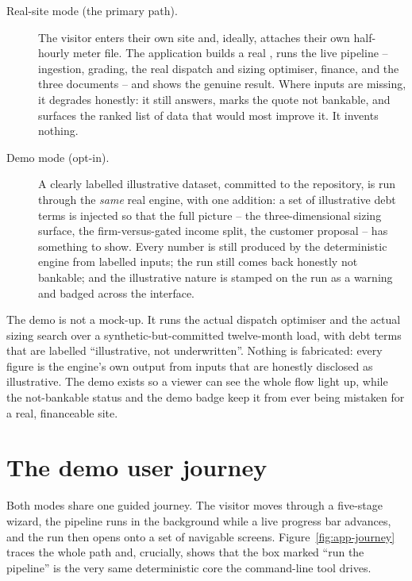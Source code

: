 \begin{description}
  \item[Real-site mode (the primary path).] The visitor enters their own site and, ideally, attaches their own half-hourly meter file. The application builds a real , runs the live pipeline -- ingestion, grading, the real dispatch and sizing optimiser, finance, and the three documents -- and shows the genuine result. Where inputs are missing, it degrades honestly: it still answers, marks the quote not bankable, and surfaces the ranked list of data that would most improve it. It invents nothing.
  \item[Demo mode (opt-in).] A clearly labelled illustrative dataset, committed to the repository, is run through the \emph{same} real engine, with one addition: a set of illustrative debt terms is injected so that the full picture -- the three-dimensional sizing surface, the firm-versus-gated income split, the customer proposal -- has something to show. Every number is still produced by the deterministic engine from labelled inputs; the run still comes back honestly not bankable; and the illustrative nature is stamped on the run as a warning and badged across the interface.
\end{description}

\begin{keyidea}
The demo is not a mock-up. It runs the actual dispatch optimiser and the actual sizing search over a synthetic-but-committed twelve-month load, with debt terms that are labelled ``illustrative, not underwritten''. Nothing is fabricated: every figure is the engine's own output from inputs that are honestly disclosed as illustrative. The demo exists so a viewer can see the whole flow light up, while the not-bankable status and the demo badge keep it from ever being mistaken for a real, financeable site.
\end{keyidea}

\section{The demo user journey}

Both modes share one guided journey. The visitor moves through a five-stage wizard, the pipeline runs in the background while a live progress bar advances, and the run then opens onto a set of navigable screens. Figure~\ref{fig:app-journey} traces the whole path and, crucially, shows that the box marked ``run the pipeline'' is the very same deterministic core the command-line tool drives.

